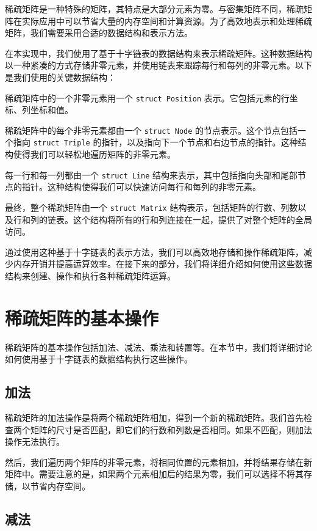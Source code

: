 \documentclass[12pt]{article}
\begin{document}
稀疏矩阵是一种特殊的矩阵，其特点是大部分元素为零。与密集矩阵不同，稀疏矩阵在实际应用中可以节省大量的内存空间和计算资源。为了高效地表示和处理稀疏矩阵，我们需要采用合适的数据结构和表示方法。

在本实现中，我们使用了基于十字链表的数据结构来表示稀疏矩阵。这种数据结构以一种紧凑的方式存储非零元素，并使用链表来跟踪每行和每列的非零元素。以下是我们使用的关键数据结构：

稀疏矩阵中的一个非零元素用一个 \verb|struct Position| 表示。它包括元素的行坐标、列坐标和值。

稀疏矩阵中的每个非零元素都由一个 \verb|struct Node| 的节点表示。这个节点包括一个指向 \verb|struct Triple| 的指针，以及指向下一个节点和右边节点的指针。这种结构使得我们可以轻松地遍历矩阵的非零元素。

每一行和每一列都由一个 \verb|struct Line| 结构来表示，其中包括指向头部和尾部节点的指针。这种结构使得我们可以快速访问每行和每列的非零元素。

最终，整个稀疏矩阵由一个 \verb|struct Matrix| 结构表示，包括矩阵的行数、列数以及行和列的链表。这个结构将所有的行和列连接在一起，提供了对整个矩阵的全局访问。

通过使用这种基于十字链表的表示方法，我们可以高效地存储和操作稀疏矩阵，减少内存开销并提高运算效率。在接下来的部分，我们将详细介绍如何使用这些数据结构来创建、操作和执行各种稀疏矩阵运算。

\newpage

\section{稀疏矩阵的基本操作}

稀疏矩阵的基本操作包括加法、减法、乘法和转置等。在本节中，我们将详细讨论如何使用基于十字链表的数据结构执行这些操作。

\subsection{加法}

稀疏矩阵的加法操作是将两个稀疏矩阵相加，得到一个新的稀疏矩阵。我们首先检查两个矩阵的尺寸是否匹配，即它们的行数和列数是否相同。如果不匹配，则加法操作无法执行。

然后，我们遍历两个矩阵的非零元素，将相同位置的元素相加，并将结果存储在新矩阵中。需要注意的是，如果两个元素相加后的结果为零，我们可以选择不将其存储，以节省内存空间。

\subsection{减法}
\end{document}
